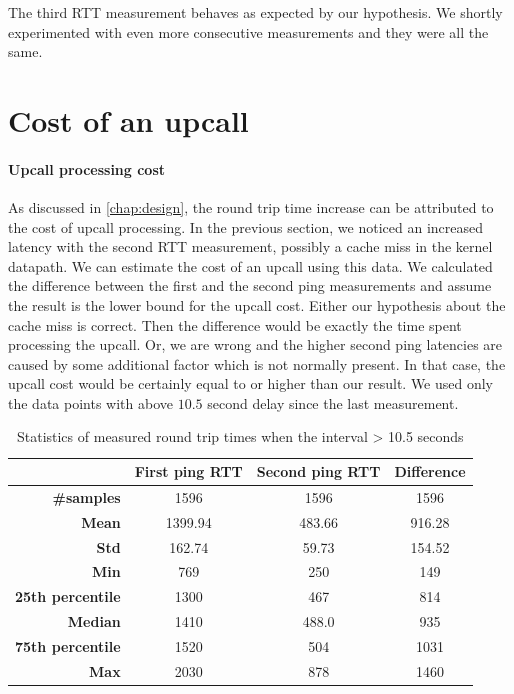 The third RTT measurement behaves as expected by our hypothesis. We shortly experimented with even more consecutive measurements and they were all the same.


\section{Cost of an upcall}
\label{res:upcall-cost}

\paragraph{Upcall processing cost}
As discussed in \cref{chap:design}, the round trip time increase can be attributed to the cost of upcall processing. In the previous section, we noticed an increased latency with the second RTT measurement, possibly a cache miss in the kernel datapath.  We can estimate the cost of an upcall using this data. We calculated the difference between the first and the second ping measurements and assume the result is the lower bound for the upcall cost. Either our hypothesis about the cache miss is correct. Then the difference would be exactly the time spent processing the upcall. Or, we are wrong and the higher second ping latencies are caused by some additional factor which is not normally present. In that case, the upcall cost would be certainly equal to or higher than our result. We used only the data points with above $10.5$ second delay since the last measurement.

\begin{table}[h!]
    \begin{center}
        \caption{Statistics of measured round trip times when the interval > 10.5 seconds}
        \label{tab:upcall-cost}
        \begin{tabular}{r|S[table-format=4.2]S[table-format=4.2]S[table-format=4.2]}
            & \textbf{First ping RTT} & \textbf{Second ping RTT} & \textbf{Difference} \\
            \hline
            \textbf{\#samples} & 1596 & 1596 & 1596 \\
            \textbf{Mean} & 1399.94 & 483.66 & 916.28 \\
            \textbf{Std} & 162.74 & 59.73 & 154.52\\
            \hline
            \textbf{Min} & 769 & 250 & 149 \\
            \textbf{25th percentile} & 1300 & 467 & 814 \\
            \textbf{Median} & 1410 & 488.0 & 935 \\
            \textbf{75th percentile} & 1520 & 504 & 1031 \\
            \textbf{Max} & 2030 & 878 & 1460 \\
        \end{tabular}
    \end{center}
\end{table}

